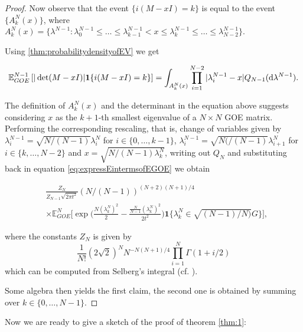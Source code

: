\begin{proof}
Now observe that the event $\{i(M-xI)=k\}$ is equal to the event $\{A_k^N(x)\}$, where $A_k^N(x) = \{\lambda^{N-1}: \lambda_0^{N-1}\leq\dots\leq\lambda_{k-1}^{N-1}<x\leq\lambda_k^{N-1}\leq\dots\leq\lambda_{N-2}^{N-1}\}$.

Using \ref{thm:probabilitydensityofEV} we get

\begin{equation*}
	\mathbb E_{GOE}^{N-1}\left[|\det(M-xI)|\mathbf 1\{i(M-xI)=k\}\right]=\int_{A_k^N(x)}\prod_{i=1}^{N-2}|\lambda_i^{N-1}-x|Q_{N-1}(\mathop{}\!\mathrm{d}\lambda^{N-1}).
\end{equation*}

The definition of $A_k^N(x)$ and the determinant in the equation above suggests considering $x$ as the $k+1$-th smallest eigenvalue of a $N\times N$ GOE matrix. Performing the corresponding rescaling, that is, change of variables given by $\lambda_i^{N-1}=\sqrt{N/(N-1)}\lambda_i^N$ for $i\in\{0,\dots,k-1\}$, $\lambda_i^{N-1}=\sqrt{N(/(N-1)}\lambda_{i+1}^N$ for $i\in\{k,\dots,N-2\}$ and $x=\sqrt{N/(N-1)\lambda_k^N}$, writing out $Q_N$ and substituting back in equation \eqref{eq:expressEintermsofEGOE} we obtain

\begin{align*}
	&\frac{Z_N}{Z_{N-1}\sqrt{2\pi t^2}}(N/(N-1))^{(N+2)(N+1)/4}\\
	&\times\mathbb E_{GOE}^N\Big[\exp\Big(\frac{N(\lambda_k^N)^2}{2}-\frac{\frac{N}{N-1}(\lambda_k^N)^2}{2t^2}\Big)\mathbf 1\{\lambda_k^N\in\sqrt{(N-1)/N)}G\}\Big],
\end{align*}

where the constants $Z_N$ is given by $$\frac{1}{N!}(2\sqrt 2)^N N^{-N(N+1)/4}\prod_{i=1}^N \Gamma(1+i/2)$$ which can be computed from Selberg's integral (cf. \cite{Mehta2004random}).

Some algebra then yields the first claim, the second one is obtained by summing over $k\in\{0,\dots,N-1\}$.

\end{proof}

Now we are ready to give a sketch of the proof of theorem \ref{thm:1}:

